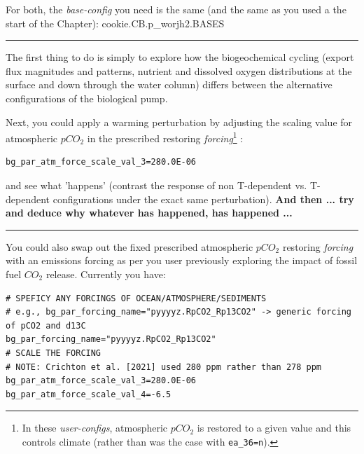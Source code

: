\vspace{1mm}
For both, the \textit{base-config} you need is the same (and the same as you used a the start of the Chapter): \textsf{\footnotesize cookie.CB.p\_worjh2.BASES}

\vspace{1mm} \noindent\rule{4cm}{0.1mm} \vspace{2mm}

\noindent The first thing to do is simply to explore how the biogeochemical cycling (export flux magnitudes and patterns, nutrient and dissolved oxygen distributions at the surface and down through the water column) differs between the alternative configurations of the biological pump.

Next, you could apply a warming perturbation by adjusting the scaling value for atmospheric \(pCO_{2}\) in the prescribed restoring \textit{forcing}\footnote{In these \textit{user-configs}, atmospheric \(pCO_{2}\) is restored to a given value and this controls climate (rather than was the case with \texttt{\small ea\_36=n}).} :

\vspace{-2mm}\footnotesize\begin{verbatim}
bg_par_atm_force_scale_val_3=280.0E-06
\end{verbatim}\normalsize\vspace{-2mm}
and see what 'happens' (contrast the response of non T-dependent vs. T-dependent configurations under the exact same perturbation). \textbf{And then ... try and deduce why whatever has happened, has happened ...}

\vspace{1mm} \noindent\rule{4cm}{0.1mm} \vspace{2mm}

\newpage

\noindent You could also swap out the fixed prescribed atmospheric \(pCO_{2}\) restoring \textit{forcing} with an emissions forcing as per you user previously exploring the impact of fossil fuel $CO_{2}$ release. Currently you have:
\vspace{-2mm}\footnotesize\begin{verbatim}
# SPEFICY ANY FORCINGS OF OCEAN/ATMOSPHERE/SEDIMENTS
# e.g., bg_par_forcing_name="pyyyyz.RpCO2_Rp13CO2" -> generic forcing of pCO2 and d13C
bg_par_forcing_name="pyyyyz.RpCO2_Rp13CO2"
# SCALE THE FORCING
# NOTE: Crichton et al. [2021] used 280 ppm rather than 278 ppm
bg_par_atm_force_scale_val_3=280.0E-06
bg_par_atm_force_scale_val_4=-6.5
\end{verbatim}\normalsize\vspace{-2mm}

